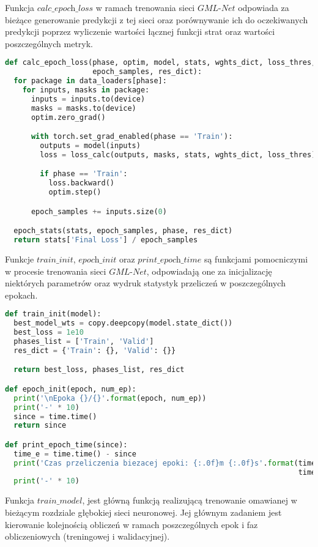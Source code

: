 \cell
Funkcja $\textit{calc$\_$epoch$\_$loss}$ w ramach trenowania sieci $\textit{GML-Net}$ odpowiada za bieżące generowanie predykcji z tej sieci oraz porównywanie ich do oczekiwanych predykcji poprzez wyliczenie wartości łącznej funkcji strat oraz wartości poszczególnych metryk.

\cell
\begin{lstlisting}[name=Rozdzial3.1, language=Python]
def calc_epoch_loss(phase, optim, model, stats, wghts_dict, loss_thres, 
                    epoch_samples, res_dict):
  for package in data_loaders[phase]:
    for inputs, masks in package:
      inputs = inputs.to(device)
      masks = masks.to(device)
      optim.zero_grad()

      with torch.set_grad_enabled(phase == 'Train'):
        outputs = model(inputs)
        loss = loss_calc(outputs, masks, stats, wghts_dict, loss_thres)

        if phase == 'Train':
          loss.backward()
          optim.step()

      epoch_samples += inputs.size(0)

  epoch_stats(stats, epoch_samples, phase, res_dict)
  return stats['Final Loss'] / epoch_samples
\end{lstlisting}


\cell
Funkcje $\textit{train$\_$init}$, $\textit{epoch$\_$init}$ oraz $\textit{print$\_$epoch$\_$time}$ są funkcjami pomocniczymi w procesie trenowania sieci $\textit{GML-Net}$, odpowiadają one za inicjalizację niektórych parametrów oraz wydruk statystyk przeliczeń w poszczególnych epokach.

\cell
\begin{lstlisting}[name=Rozdzial3.1, language=Python]
def train_init(model):
  best_model_wts = copy.deepcopy(model.state_dict())
  best_loss = 1e10
  phases_list = ['Train', 'Valid']
  res_dict = {'Train': {}, 'Valid': {}}

  return best_loss, phases_list, res_dict

def epoch_init(epoch, num_ep):
  print('\nEpoka {}/{}'.format(epoch, num_ep))
  print('-' * 10)
  since = time.time()
  return since

def print_epoch_time(since):
  time_e = time.time() - since
  print('Czas przeliczenia biezacej epoki: {:.0f}m {:.0f}s'.format(time_e // 60,
                                                                   time_e % 60))
  print('-' * 10)
\end{lstlisting}


\cell
Funkcja $\textit{train$\_$model}$, jest główną funkcją realizującą trenowanie omawianej w bieżącym rozdziale głębokiej sieci neuronowej. Jej głównym zadaniem jest kierowanie kolejnością obliczeń w ramach poszczególnych epok i faz obliczeniowych (treningowej i walidacyjnej).

